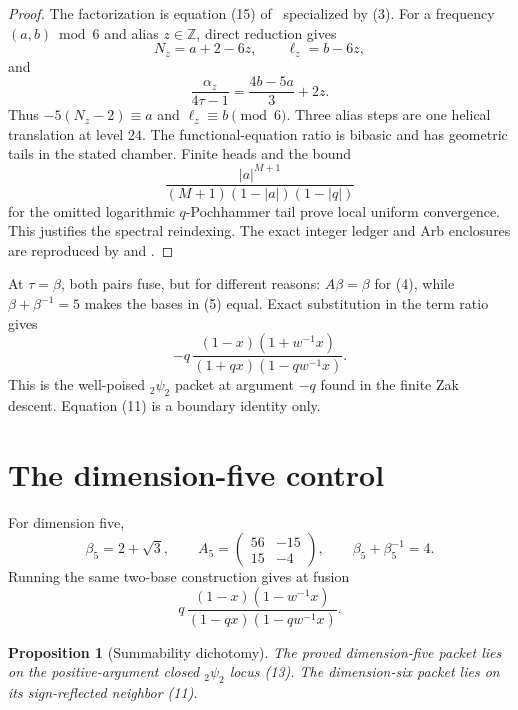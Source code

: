 \documentclass[11pt]{article}
\newtheorem{proposition}[theorem]{Proposition}
\newcommand{\Z}{\mathbb Z}
\begin{document}
\begin{proof}
The factorization is equation (15) of~\cite{SS} specialized by (3).
For a frequency $(a,b)\bmod6$ and alias $z\in\Z$, direct reduction gives
\[
 N_z=a+2-6z,\qquad \ell_z=b-6z,
\tag{8}
\]
and
\[
 \frac{\alpha_z}{4\tau-1}
 =\frac{4b-5a}{3}+2z.
\tag{9}
\]
Thus $-5(N_z-2)\equiv a$ and $\ell_z\equiv b\pmod6$.
Three alias steps are one helical translation at level $24$.
The functional-equation ratio is bibasic and has geometric tails in
the stated chamber.  Finite heads and the bound
\[
 \frac{|a|^{M+1}}
 {(M+1)(1-|a|)(1-|q|)}
\tag{10}
\]
for the omitted logarithmic $q$-Pochhammer tail prove local uniform
convergence.  This justifies the spectral reindexing.  The exact
integer ledger and Arb enclosures are reproduced by
 and
.
\end{proof}

At $\tau=\beta$, both pairs fuse, but for different reasons:
$A\beta=\beta$ for (4), while
$\beta+\beta^{-1}=5$ makes the bases in (5) equal.  Exact substitution
in the term ratio gives
\[
 -q\,\frac{(1-x)(1+w^{-1}x)}
 {(1+qx)(1-qw^{-1}x)}.
\tag{11}
\]
This is the well-poised ${}_2\psi_2$ packet at argument $-q$ found in
the finite Zak descent.  Equation (11) is a boundary identity only.

\section{The dimension-five control}

For dimension five,
\[
 \beta_5=2+\sqrt3,\qquad
 A_5=\begin{pmatrix}56&-15\\15&-4\end{pmatrix},\qquad
 \beta_5+\beta_5^{-1}=4.
\tag{12}
\]
Running the same two-base construction gives at fusion
\[
 q\,\frac{(1-x)(1-w^{-1}x)}
 {(1-qx)(1-qw^{-1}x)}.
\tag{13}
\]

\begin{proposition}[Summability dichotomy]\label{prop:dichotomy}
The proved dimension-five packet lies on the positive-argument
closed ${}_2\psi_2$ locus (13).  The dimension-six packet lies on its
sign-reflected neighbor (11).
\end{proposition}
\end{document}
